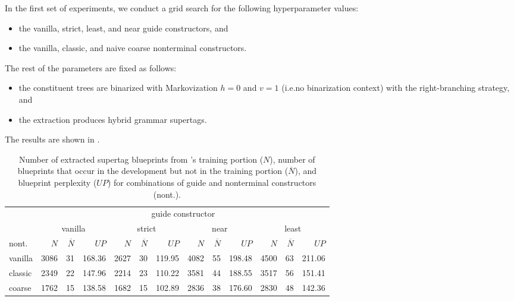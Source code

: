 \documentclass[../../document.tex]{subfiles}
\begin{document}
    In the first set of experiments, we conduct a grid search for the following hyperparameter values:
    \begin{itemize}
        \item the vanilla, strict, least, and near guide constructors, and
        \item the vanilla, classic, and naive coarse nonterminal constructors.
    \end{itemize}
    The rest of the parameters are fixed as follows:
    \begin{itemize}
        \item the constituent trees are binarized with Markovization \(h=0\) and \(v=1\) (i.e.\@ no binarization context) with the right-branching strategy, and
        \item the extraction produces hybrid grammar supertags.
    \end{itemize}
    The results are shown in .

    \begin{table}
        \caption{\label{tbl:gridsearch:1:1}
            Number of extracted supertag blueprints from \negra{}'s training portion ($N$), number of blueprints that occur in the development but not in the training portion ($\overline{N}$), and blueprint perplexity ($\mathit{UP}$) for combinations of guide and nonterminal constructors (nont.).
        }
        \centering
        \setlength{\tabcolsep}{5pt}
        \vspace{.2cm}
        \begin{tabular}{l|rrr|rrr|rrr|rrr}
            \toprule
                        & \multicolumn{12}{c}{guide constructor}\\
                        & \multicolumn{3}{c|}{vanilla} & \multicolumn{3}{c|}{strict} & \multicolumn{3}{c|}{near} & \multicolumn{3}{c}{least} \\
            nont.       & $N$ & $\overline{N}$ & $\mathit{UP}$ & $N$ & $\overline{N}$ & $\mathit{UP}$ & $N$ & $\overline{N}$ & $\mathit{UP}$ & $N$ & $\overline{N}$ & $\mathit{UP}$ \\ \hline
            vanilla     & 3086 & 31 & 168.36 & 2627 & 30 & 119.95 & 4082 & 55 & 198.48 & 4500 & 63 & 211.06 \\
            classic     & 2349 & 22 & 147.96 & 2214 & 23 & 110.22 & 3581 & 44 & 188.55 & 3517 & 56 & 151.41 \\
            coarse      & 1762 & 15 & 138.58 & 1682 & 15 & 102.89 & 2836 & 38 & 176.60 & 2830 & 48 & 142.36 \\
            \bottomrule
        \end{tabular}
    \end{table}
\end{document}
